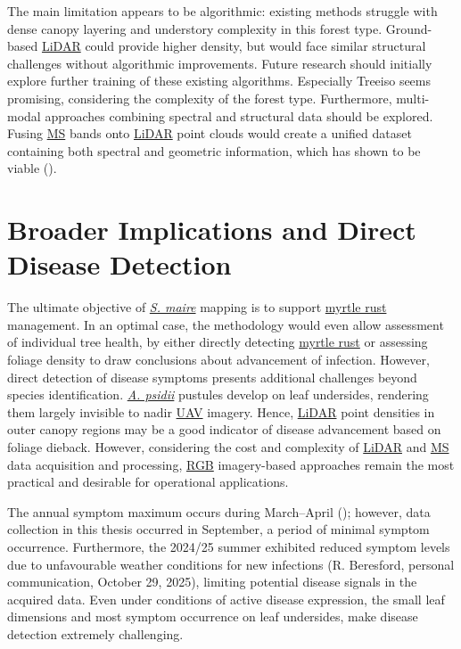 \documentclass[
]{scrreprt}
\begin{document}
The main limitation appears to be algorithmic: existing methods struggle
with dense canopy layering and understory complexity in this forest
type. Ground-based \hyperref[acronyms_LiDAR]{LiDAR} could provide higher
density, but would face similar structural challenges without
algorithmic improvements. Future research should initially explore
further training of these existing algorithms. Especially Treeiso seems
promising, considering the complexity of the forest type. Furthermore,
multi-modal approaches combining spectral and structural data should be
explored. Fusing \hyperref[acronyms_MS]{MS} bands onto
\hyperref[acronyms_LiDAR]{LiDAR} point clouds would create a unified
dataset containing both spectral and geometric information, which has
shown to be viable
().

\section{Broader Implications and Direct Disease
Detection}\label{broader-implications-and-direct-disease-detection}

The ultimate objective of \hyperref[acronyms_SM]{\emph{S. maire}}
mapping is to support \hyperref[acronyms_MR]{myrtle rust} management. In
an optimal case, the methodology would even allow assessment of
individual tree health, by either directly detecting
\hyperref[acronyms_MR]{myrtle rust} or assessing foliage density to draw
conclusions about advancement of infection. However, direct detection of
disease symptoms presents additional challenges beyond species
identification. \hyperref[acronyms_AP]{\emph{A. psidii}} pustules
develop on leaf undersides, rendering them largely invisible to nadir
\hyperref[acronyms_UAV]{UAV} imagery. Hence,
\hyperref[acronyms_LiDAR]{LiDAR} point densities in outer canopy regions
may be a good indicator of disease advancement based on foliage dieback.
However, considering the cost and complexity of
\hyperref[acronyms_LiDAR]{LiDAR} and \hyperref[acronyms_MS]{MS} data
acquisition and processing, \hyperref[acronyms_RGB]{RGB} imagery-based
approaches remain the most practical and desirable for operational
applications.

The annual symptom maximum occurs during March--April
();
however, data collection in this thesis occurred in September, a period
of minimal symptom occurrence. Furthermore, the 2024/25 summer exhibited
reduced symptom levels due to unfavourable weather conditions for new
infections (R. Beresford, personal communication, October 29, 2025),
limiting potential disease signals in the acquired data. Even under
conditions of active disease expression, the small leaf dimensions and
most symptom occurrence on leaf undersides, make disease detection
extremely challenging.
\end{document}
